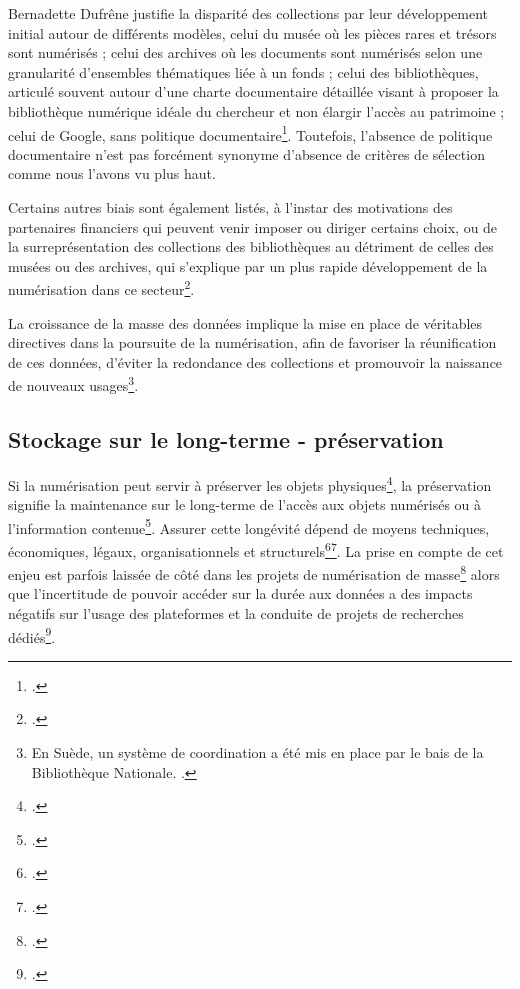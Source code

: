 Bernadette Dufrêne justifie la disparité des collections par leur développement initial autour de différents modèles, celui du musée où les pièces rares et trésors sont numérisés ; celui des archives où les documents sont numérisés selon une granularité d'ensembles thématiques liée à un fonds ; celui des bibliothèques, articulé souvent autour d'une charte documentaire détaillée visant à proposer la bibliothèque numérique idéale du chercheur et non élargir l'accès au patrimoine ; celui de Google, sans politique documentaire\footcite{dufrene_numerisation_2013}. Toutefois, l'absence de politique documentaire n'est pas forcément synonyme d'absence de critères de sélection comme nous l'avons vu plus haut.

Certains autres biais sont également listés, à l'instar des motivations des partenaires financiers qui peuvent venir imposer ou diriger certains choix, ou de la surreprésentation des collections des bibliothèques au détriment de celles des musées ou des archives, qui s'explique par un plus rapide développement de la numérisation dans ce secteur\footcite{coutts_stepping_2017}.

La croissance de la masse des données implique la mise en place de véritables directives dans la poursuite de la numérisation, afin de favoriser la réunification de ces données, d'éviter la redondance des collections et promouvoir la naissance de nouveaux usages\footnote{En Suède, un système de coordination a été mis en place par le bais de la Bibliothèque Nationale. \cite{dufrene_numerisation_2013}.}. 

\subsection{Stockage sur le long-terme - préservation} \label{preservation}

Si la numérisation peut servir à préserver les objets physiques\footcite{xie_discover_2016}, la préservation signifie la maintenance sur le long-terme de l'accès aux objets numérisés ou à l'information contenue\footcite{coutts_stepping_2017}. Assurer cette longévité dépend de moyens techniques, économiques, légaux, organisationnels et structurels\footcite{xie_discover_2016}\footcite{georgetown_university_long_2009}. La prise en compte de cet enjeu est parfois laissée de côté dans les projets de numérisation de masse\footcite{lopatin_library_2006} alors que l'incertitude de pouvoir accéder sur la durée aux données a des impacts négatifs sur l'usage des plateformes et la conduite de projets de recherches dédiés\footcite{shankar_sustaining_2015}. 

